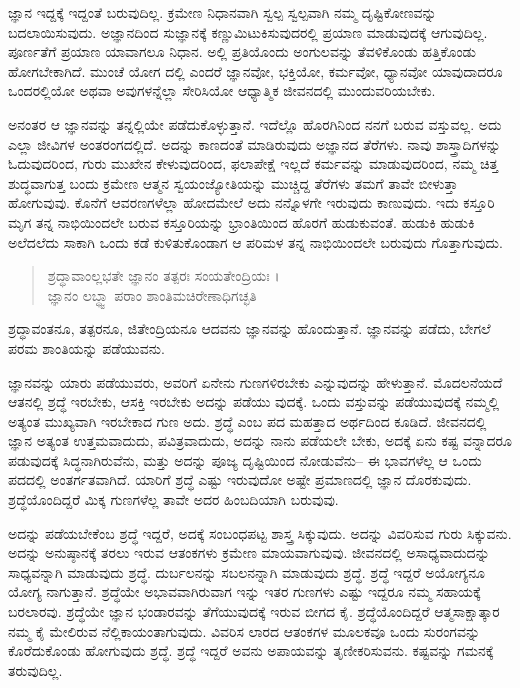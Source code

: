 ಜ್ಞಾನ ಇದ್ದಕ್ಕೆ ಇದ್ದಂತೆ ಬರುವುದಿಲ್ಲ. ಕ್ರಮೇಣ ನಿಧಾನವಾಗಿ ಸ್ವಲ್ಪ ಸ್ವಲ್ಪವಾಗಿ ನಮ್ಮ ದೃಷ್ಟಿಕೋಣವನ್ನು ಬದಲಾಯಿಸುವುದು. ಅಜ್ಞಾನದಿಂದ ಸುಜ್ಞಾನಕ್ಕೆ ಕಣ್ಣುಮಿಟುಕಿಸುವುದರಲ್ಲಿ ಪ್ರಯಾಣ ಮಾಡುವುದಕ್ಕೆ ಆಗುವುದಿಲ್ಲ. ಪೂರ್ಣತೆಗೆ ಪ್ರಯಾಣ ಯಾವಾಗಲೂ ನಿಧಾನ. ಅಲ್ಲಿ ಪ್ರತಿಯೊಂದು ಅಂಗುಲವನ್ನು ತೆವಳಿಕೊಂಡು ಹತ್ತಿಕೊಂಡು ಹೋಗಬೇಕಾಗಿದೆ. ಮುಂಚೆ ಯೋಗ ದಲ್ಲಿ ಎಂದರೆ ಜ್ಞಾನವೋ, ಭಕ್ತಿಯೋ, ಕರ್ಮವೋ, ಧ್ಯಾನವೋ ಯಾವುದಾದರೂ ಒಂದರಲ್ಲಿಯೋ ಅಥವಾ ಅವುಗಳನ್ನೆಲ್ಲಾ ಸೇರಿಸಿಯೋ ಆಧ್ಯಾತ್ಮಿಕ ಜೀವನದಲ್ಲಿ ಮುಂದುವರಿಯಬೇಕು.

ಅನಂತರ ಆ ಜ್ಞಾನವನ್ನು ತನ್ನಲ್ಲಿಯೇ ಪಡೆದುಕೊಳ್ಳುತ್ತಾನೆ. ಇದೆಲ್ಲೊ ಹೊರಗಿನಿಂದ ನನಗೆ ಬರುವ ವಸ್ತುವಲ್ಲ. ಅದು ಎಲ್ಲಾ ಜೀವಿಗಳ ಅಂತರಂಗದಲ್ಲಿದೆ. ಅದನ್ನು ಕಾಣದಂತೆ ಮಾಡಿರುವುದು ಅಜ್ಞಾನದ ತೆರೆಗಳು. ನಾವು ಶಾಸ್ತ್ರಾದಿಗಳನ್ನು ಓದುವುದರಿಂದ, ಗುರು ಮುಖೇನ ಕೇಳುವುದರಿಂದ, ಫಲಾಪೇಕ್ಷೆ ಇಲ್ಲದೆ ಕರ್ಮವನ್ನು ಮಾಡುವುದರಿಂದ, ನಮ್ಮ ಚಿತ್ತ ಶುದ್ಧವಾಗುತ್ತ ಬಂದು ಕ್ರಮೇಣ ಆತ್ಮನ ಸ್ವಯಂಜ್ಯೋತಿಯನ್ನು ಮುಚ್ಚಿದ್ದ ತೆರೆಗಳು ತಮಗೆ ತಾವೇ ಬೀಳುತ್ತಾ ಹೋಗುವುವು. ಕೊನೆಗೆ ಆವರಣಗಳೆಲ್ಲಾ ಹೋದಮೇಲೆ ಅದು ನನ್ನೊಳಗೇ ಇರುವುದು ಕಾಣುವುದು. ಇದು ಕಸ್ತೂರಿ ಮೃಗ ತನ್ನ ನಾಭಿಯಿಂದಲೇ ಬರುವ ಕಸ್ತೂರಿಯನ್ನು ಭ್ರಾಂತಿಯಿಂದ ಹೊರಗೆ ಹುಡುಕುವಂತೆ. ಹುಡುಕಿ ಹುಡುಕಿ ಅಲೆದಲೆದು ಸಾಕಾಗಿ ಒಂದು ಕಡೆ ಕುಳಿತುಕೊಂಡಾಗ ಆ ಪರಿಮಳ ತನ್ನ ನಾಭಿಯಿಂದಲೇ ಬರುವುದು ಗೊತ್ತಾಗುವುದು.

\begin{verse}
ಶ್ರದ್ಧಾವಾಂಲ್ಲಭತೇ ಜ್ಞಾನಂ ತತ್ಪರಃ ಸಂಯತೇಂದ್ರಿಯಃ ।\\ಜ್ಞಾನಂ ಲಬ್ಧ್ವಾ ಪರಾಂ ಶಾಂತಿಮಚಿರೇಣಾಧಿಗಚ್ಛತಿ 
\end{verse}

{\small ಶ್ರದ್ಧಾವಂತನೂ, ತತ್ಪರನೂ, ಜಿತೇಂದ್ರಿಯನೂ ಆದವನು ಜ್ಞಾನವನ್ನು ಹೊಂದುತ್ತಾನೆ. ಜ್ಞಾನವನ್ನು ಪಡೆದು, ಬೇಗಲೆ ಪರಮ ಶಾಂತಿಯನ್ನು ಪಡೆಯುವನು.}

ಜ್ಞಾನವನ್ನು ಯಾರು ಪಡೆಯುವರು, ಅವರಿಗೆ ಏನೇನು ಗುಣಗಳಿರಬೇಕು ಎನ್ನುವುದನ್ನು ಹೇಳುತ್ತಾನೆ. ಮೊದಲನೆಯದೆ ಆತನಲ್ಲಿ ಶ್ರದ್ಧೆ ಇರಬೇಕು, ಆಸಕ್ತಿ ಇರಬೇಕು ಅದನ್ನು ಪಡೆಯು ವುದಕ್ಕೆ. ಒಂದು ವಸ್ತುವನ್ನು ಪಡೆಯುವುದಕ್ಕೆ ನಮ್ಮಲ್ಲಿ ಅತ್ಯಂತ ಮುಖ್ಯವಾಗಿ ಇರಬೇಕಾದ ಗುಣ ಅದು. ಶ್ರದ್ಧೆ ಎಂಬ ಪದ ಮಹತ್ತಾದ ಅರ್ಥದಿಂದ ಕೂಡಿದೆ. ಜೀವನದಲ್ಲಿ ಜ್ಞಾನ ಅತ್ಯಂತ ಉತ್ತಮವಾದುದು, ಪವಿತ್ರವಾದುದು, ಅದನ್ನು ನಾನು ಪಡೆಯಲೇ ಬೇಕು, ಅದಕ್ಕೆ ಏನು ಕಷ್ಟ ವನ್ನಾದರೂ ಪಡುವುದಕ್ಕೆ ಸಿದ್ಧನಾಗಿರುವೆನು, ಮತ್ತು ಅದನ್ನು ಪೂಜ್ಯ ದೃಷ್ಟಿಯಿಂದ ನೋಡುವೆನು– ಈ ಭಾವಗಳೆಲ್ಲ ಆ ಒಂದು ಪದದಲ್ಲಿ ಅಂತರ್ಗತವಾಗಿದೆ. ಯಾರಿಗೆ ಶ್ರದ್ಧೆ ಎಷ್ಟು ಇರುವುದೋ ಅಷ್ಟೇ ಪ್ರಮಾಣದಲ್ಲಿ ಜ್ಞಾನ ದೊರಕುವುದು. ಶ್ರದ್ಧೆಯೊಂದಿದ್ದರೆ ಮಿಕ್ಕ ಗುಣಗಳೆಲ್ಲ ತಾವೇ ಅದರ ಹಿಂಬದಿಯಾಗಿ ಬರುವುವು.

ಅದನ್ನು ಪಡೆಯಬೇಕೆಂಬ ಶ್ರದ್ಧೆ ಇದ್ದರೆ, ಅದಕ್ಕೆ ಸಂಬಂಧಪಟ್ಟ ಶಾಸ್ತ್ರ ಸಿಕ್ಕುವುದು. ಅದನ್ನು ವಿವರಿಸುವ ಗುರು ಸಿಕ್ಕುವನು. ಅದನ್ನು ಅನುಷ್ಠಾನಕ್ಕೆ ತರಲು ಇರುವ ಆತಂಕಗಳು ಕ್ರಮೇಣ ಮಾಯವಾಗುವುವು. ಜೀವನದಲ್ಲಿ ಅಸಾಧ್ಯವಾದುದನ್ನು ಸಾಧ್ಯವನ್ನಾಗಿ ಮಾಡುವುದು ಶ್ರದ್ಧೆ. ದುರ್ಬಲನನ್ನು ಸಬಲನನ್ನಾಗಿ ಮಾಡುವುದು ಶ್ರದ್ಧೆ. ಶ್ರದ್ಧೆ ಇದ್ದರೆ ಅಯೋಗ್ಯನೂ ಯೋಗ್ಯ ನಾಗುತ್ತಾನೆ. ಶ್ರದ್ಧೆಯೇ ಅಭಾವವಾಗಿರುವಾಗ ಇನ್ನು ಇತರ ಗುಣಗಳು ಎಷ್ಟು ಇದ್ದರೂ ನಮ್ಮ ಸಹಾಯಕ್ಕೆ ಬರಲಾರವು. ಶ್ರದ್ಧೆಯೇ ಜ್ಞಾನ ಭಂಡಾರವನ್ನು ತೆಗೆಯುವುದಕ್ಕೆ ಇರುವ ಬೀಗದ ಕೈ. ಶ್ರದ್ಧೆಯೊಂದಿದ್ದರೆ ಆತ್ಮಸಾಕ್ಷಾತ್ಕಾರ ನಮ್ಮ ಕೈ ಮೇಲಿರುವ ನೆಲ್ಲಿಕಾಯಂತಾಗುವುದು. ವಿವರಿಸ ಲಾರದ ಆತಂಕಗಳ ಮೂಲಕವೂ ಒಂದು ಸುರಂಗವನ್ನು ಕೊರೆದುಕೊಂಡು ಹೋಗುವುದು ಶ್ರದ್ಧೆ. ಶ್ರದ್ಧೆ ಇದ್ದರೆ ಅವನು ಅಪಾಯವನ್ನು ತೃಣೀಕರಿಸುವನು. ಕಷ್ಟವನ್ನು ಗಮನಕ್ಕೆ ತರುವುದಿಲ್ಲ.

